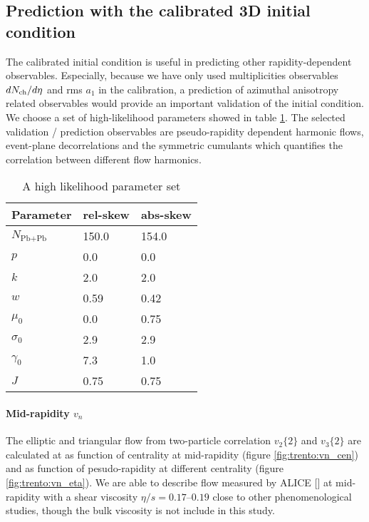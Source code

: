 \subsection{Prediction with the calibrated 3D initial condition}
The calibrated initial condition is useful in predicting other rapidity-dependent observables.
Especially, because we have only used multiplicities observables $dN_\text{ch}/d\eta$ and rms $a_1$ in the calibration, a prediction of azimuthal anisotropy related observables would provide an important validation of the initial condition.
We choose a set of high-likelihood parameters showed in table \ref{tab:chosen_parameters}.
The selected validation / prediction observables are pseudo-rapidity dependent harmonic flows, event-plane decorrelations and the symmetric cumulants which quantifies the correlation between different flow harmonics.

\begin{table}
\centering
\caption{A high likelihood parameter set}
\begin{tabular}{lll}
\hline
Parameter & rel-skew	& abs-skew \\
\hline
$N_{\textrm{Pb+Pb}}$   & 150.0     & 154.0  \\
$p$	    & 0.0      & 0.0  \\
$k$	    & 2.0     & 2.0  \\
$w$	    & 0.59     & 0.42  \\
$\mu_0$   & 0.0     & 0.75  \\
$\sigma_0$ & 2.9    & 2.9  \\
$\gamma_0$ & 7.3		& 1.0	\\
$J$	     & 0.75 & 0.75	\\
\hline
\end{tabular}
\label{tab:chosen_parameters}    
\end{table}

\paragraph{Mid-rapidity $v_n$} The elliptic and triangular flow from two-particle correlation $v_2\{2\}$ and $v_3\{2\}$ are calculated at as function of centrality at mid-rapidity (figure \ref{fig:trento:vn_cen}) and as function of pesudo-rapidity at different centrality (figure \ref{fig:trento:vn_eta}).
We are able to describe flow measured by ALICE [] at mid-rapidity with a shear viscosity $\eta/s = 0.17$--$0.19$ close to other phenomenological studies, though the bulk viscosity is not include in this study.

